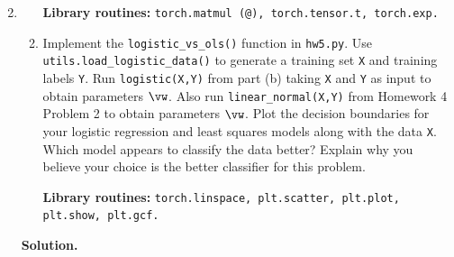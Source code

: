 \documentclass{article}
\theoremstyle{definition}
\theoremstyle{remark}
\newenvironment{Q}
{%
\clearpage
\item
}
{%
\phantom{s}%
\bigskip%
\noindent\textbf{Solution.}
}
\begin{document}
\begin{enumerate}[font={\Large\bfseries},left=0pt]
\begin{Q}
\begin{enumerate}
  \textbf{Library routines:} \texttt{torch.matmul (@), torch.tensor.t, torch.exp.}
  
  \item Implement the \texttt{logistic\_vs\_ols()} function in \texttt{hw5.py}. Use \texttt{utils.load\_logistic\_data()} to generate a training set \texttt{X} and training labels \texttt{Y}.  Run \texttt{logistic(X,Y)} from part (b) taking \texttt{X} and \texttt{Y} as input to obtain parameters $\vw$.  Also run \texttt{linear\_normal(X,Y)} from Homework 4 Problem 2 to obtain parameters $\vw$.  Plot the decision boundaries for your logistic regression and least squares models along with the data \texttt{X}. Which model appears to classify the data better? Explain why you believe your choice is the better classifier for this problem.
  
  \textbf{Library routines:} \texttt{torch.linspace, plt.scatter, plt.plot, plt.show, plt.gcf.}
  

\end{enumerate}
\end{Q}
\end{enumerate}
\end{document}
